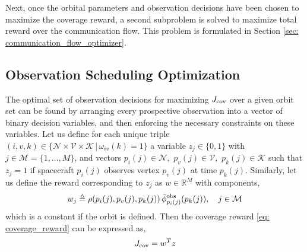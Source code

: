 \documentclass[letterpaper, 10 pt, conference]{ieeeconf}  %
\theoremstyle{definition}
\begin{document}
Next, once the orbital parameters and observation decisions have been chosen to maximize the coverage reward, a second subproblem is solved to maximize total reward over the communication flow. This problem is formulated in Section \ref{sec: communication_flow_optimizer}.  


    


\subsection{Observation Scheduling Optimization} \label{sec: observation_points_subproblem}

The optimal set of observation decisions for maximizing $J_{\rm cov}$ over a given orbit set can be found by arranging every prospective observation into a vector of binary decision variables, and then enforcing the necessary constraints on these variables. Let us define for each unique triple $(i,v,k)\in\{\mathcal{N}\times \mathcal{V} \times \mathcal{K} \,|\, \omega_{iv}(k)=1\}$ a variable $z_j\in\{0,1\}$ with $j\in\mathcal{M}=\{1,...,M\}$, and vectors $p_i(j)\in\mathcal{N},\,\, p_v(j)\in\mathcal{V},\,\, p_k(j)\in\mathcal{K}$ such that $z_j=1$ if spacecraft $p_i(j)$ observes vertex $p_v(j)$ at time $p_k(j)$. Similarly, let us define the reward corresponding to $z_j$ as $w\in\mathbb{R}^M$ with components, 
\begin{equation}
    w_j\triangleq \rho(p_i(j),p_v(j),p_k(j)) \, \bar{\phi}^{\rm obs}_{p_i(j)}({p_k(j)}), \quad j\in\mathcal{M}
\end{equation}
which is a constant if the orbit is defined. Then the coverage reward \eqref{eq: coverage_reward} can be expressed as,  
\begin{equation}
    J_{\rm cov} = w^T z 
\end{equation}
\end{document}
